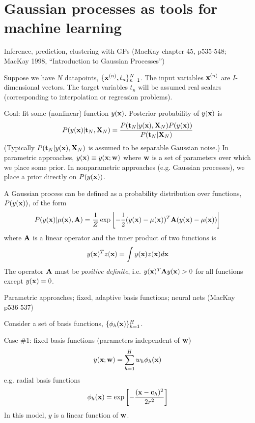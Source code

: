\documentclass{beamer}
\begin{document}
\section{Gaussian processes as tools for machine learning}

\begin{frame}{}

\itemb
\item Inference, prediction, clustering with GPs (MacKay chapter 45, p535-548; MacKay 1998, ``Introduction to Gaussian Processes'')
 \itemb
 \item Suppose we have $N$ datapoints, $\{ {\bf x}^{(n)}, t_n \}_{n=1}^N$.
The input variables ${\bf x}^{(n)}$ are $I$-dimensional vectors.
The target variables $t_n$ will be assumed real scalars (corresponding to interpolation or regression problems).
 \item Goal: fit some (nonlinear) function $y({\bf x})$. Posterior probability of $y({\bf x})$ is
\[
P(y({\bf x})|{\bf t}_N,{\bf X}_N) = \frac{P({\bf t}_N|y({\bf x}),{\bf X}_N) P(y({\bf x}))}{P({\bf t}_N|{\bf X}_N)}
\]
(Typically $P({\bf t}_N|y({\bf x}),{\bf X}_N)$ is assumed to be separable Gaussian noise.)
In parametric approaches, $y({\bf x}) \equiv y({\bf x};{\bf w})$ where ${\bf w}$ is a set of parameters over which we place some prior.
In nonparametric approaches (e.g. Gaussian processes), we place a prior directly on $P(y({\bf x}))$.
 \iteme
\item A Gaussian process can be defined as a probability distribution over functions, $P(y({\bf x}))$, of the form
\[
P(y({\bf x})|\mu({\bf x}),{\bf A}) = \frac{1}{Z} \exp \left[ -\frac{1}{2} (y({\bf x})-\mu({\bf x}))^T {\bf A} (y({\bf x})-\mu({\bf x})) \right]
\]
where ${\bf A}$ is a linear operator and the inner product of two functions is
\[
y({\bf x})^T z({\bf x}) = \int y({\bf x}) z({\bf x}) d{\bf x}
\]
The operator ${\bf A}$ must be {\em positive definite}, i.e. $y({\bf x})^T {\bf A} y({\bf x}) > 0$ for all functions except $y({\bf x})=0$.
\item Parametric approaches; fixed, adaptive basis functions; neural nets (MacKay p536-537)
 \itemb
 \item Consider a set of basis functions, $\{ \phi_h({\bf x}) \}_{h=1}^H$.
 \item Case \#1: fixed basis functions (parameters independent of ${\bf w}$)
\[
y({\bf x};{\bf w}) = \sum_{h=1}^H w_h \phi_h({\bf x})
\]
e.g. radial basis functions
\[
\phi_h({\bf x}) = \exp \left[ -\frac{({\bf x}-{\bf c}_h)^2}{2r^2} \right]
\]
In this model, $y$ is a linear function of ${\bf w}$.

\end{frame}
\end{document}
